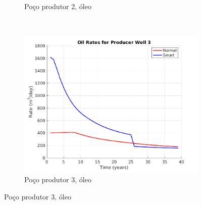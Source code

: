 \begin{figure}[!ht]
\begin{subfigure}[b]{.3\textwidth}
		\caption{Po\c{c}o produtor 2, \'{o}leo}
		\label{LSAIGUP_OilWell2}
	\end{subfigure}
	~
	\begin{subfigure}[b]{.3\textwidth}
		\includegraphics[width=\textwidth]{figs/resultadosLSAIGUP/LSAIGUP_OilWell3_Zoom}
		\caption{Po\c{c}o produtor 3, \'{o}leo}
		\label{LSAIGUP_OilWell3}
	\end{subfigure}
	

\end{figure}
